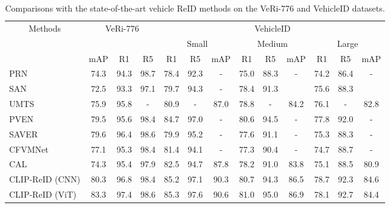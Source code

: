 \documentclass[letterpaper]{article} \usepackage{aaai23}  \usepackage{times}  \usepackage{helvet}  \usepackage{courier}  \usepackage[hyphens]{url}  \usepackage{graphicx} \urlstyle{rm} \def\UrlFont{\rm}  \usepackage{natbib}  \usepackage{caption} \frenchspacing  \setlength{\pdfpagewidth}{8.5in}  \setlength{\pdfpageheight}{11in}  \usepackage{algorithm}
\begin{document}
\begin{table*}[]
\centering
\begin{tabular}{l|ccc|ccccccccc}
\hline

\multicolumn{1}{c|}{\multirow{3}{*}{Methods}} & \multicolumn{3}{c|}{\multirow{2}{*}{VeRi-776}} & \multicolumn{9}{c}{VehicleID} \\ \cline{5-13} 
 & \multicolumn{3}{c|}{} & \multicolumn{3}{c|}{Small} & \multicolumn{3}{c|}{Medium} & \multicolumn{3}{c}{Large} \\
 & mAP & R1 & R5 & R1 & R5 & \multicolumn{1}{c|}{mAP} & R1 & R5 & \multicolumn{1}{c|}{mAP} & R1 & R5 & mAP \\ \hline
PRN & 74.3 & 94.3 & 98.7 & 78.4 & 92.3 & \multicolumn{1}{c|}{-} & 75.0 & 88.3 & \multicolumn{1}{c|}{-} & 74.2 & 86.4 & - \\
SAN & 72.5 & 93.3 & 97.1 & 79.7 & 94.3 & \multicolumn{1}{c|}{-} & 78.4 & 91.3 & \multicolumn{1}{c|}{} & 75.6 & 88.3 &  \\
UMTS & 75.9 & 95.8 & - & 80.9 & - & \multicolumn{1}{c|}{87.0} & 78.8 & - & \multicolumn{1}{c|}{84.2} & 76.1 & - & 82.8 \\
PVEN & 79.5 & 95.6 & 98.4 & 84.7 & 97.0 & \multicolumn{1}{c|}{-} & 80.6 & 94.5 & \multicolumn{1}{c|}{-} & 77.8 & 92.0 & - \\
SAVER & 79.6 & 96.4 & 98.6 & 79.9 & 95.2 & \multicolumn{1}{c|}{-} & 77.6 & 91.1 & \multicolumn{1}{c|}{-} & 75.3 & 88.3 & - \\
CFVMNet & 77.1 & 95.3 & 98.4 & 81.4 & 94.1 & \multicolumn{1}{c|}{-} & 77.3 & 90.4 & \multicolumn{1}{c|}{-} & 74.7 & 88.7 & - \\
CAL & 74.3 & 95.4 & 97.9 & 82.5 & 94.7 & \multicolumn{1}{c|}{87.8} & 78.2 & 91.0 & \multicolumn{1}{c|}{83.8} & 75.1 & 88.5 & 80.9 \\ \hline
CLIP-ReID (CNN) & 80.3 & 96.8 & 98.4 & 85.2 & 97.1 & \multicolumn{1}{c|}{90.3} & 80.7 & 94.3 & \multicolumn{1}{c|}{86.5} & 78.7 & 92.3 & 84.6 \\
CLIP-ReID (ViT) & 83.3 & 97.4 & 98.6 & 85.3 & 97.6 & \multicolumn{1}{c|}{90.6} & 81.0 & 95.0 & \multicolumn{1}{c|}{86.9} & 78.1 & 92.7 & 84.4 \\ \hline
\end{tabular}
\caption{Comparisons with the state-of-the-art vehicle ReID methods on the VeRi-776 and VehicleID datasets.}
\label{tab:vehicleall}
\end{table*}
\end{document}
